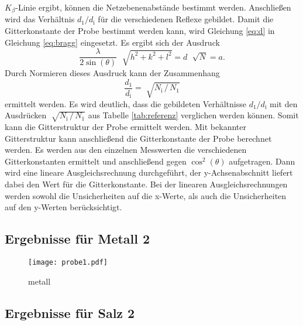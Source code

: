 $K_\beta$-Linie ergibt, können die Netzebenenabstände bestimmt werden. Anschließen wird das Verhältnis $d_1 / d_\text{i}$ für die verschiedenen Reflexe gebildet.\newline
Damit die Gitterkonstante der Probe bestimmt werden kann, wird Gleichung \eqref{eq:d} in Gleichung \eqref{eq:bragg} eingesetzt. Es ergibt sich der Ausdruck
\begin{equation}
  \frac{\lambda}{2\sin(\theta)}\,\,\sqrt[]{h^2+k^2+l^2}=d\,\,\sqrt[]{N}=a.
\end{equation}
Durch Normieren dieses Ausdruck kann der Zusammenhang
\begin{equation}
\frac{d_1}{d_\text{i}}=\sqrt[]{N_\text{i}\, / \, N_1}
\end{equation}
ermittelt werden. Es wird deutlich, dass die gebildeten Verhältnisse $d_1 / d_\text{i}$ mit den Ausdrücken $\sqrt[]{N_\text{i}\, / \, N_1}$ aus Tabelle
\ref{tab:referenz} verglichen werden können. Somit kann die Gitterstruktur der Probe ermittelt werden.
Mit bekannter Gitterstruktur kann anschließend die Gitterkonstante der Probe berechnet werden. Es werden aus den einzelnen Messwerten die verschiedenen
Gitterkonstanten ermittelt und anschließend gegen $\cos^2(\theta)$ aufgetragen. Dann wird eine lineare Ausgleichsrechnung durchgeführt, der y-Achsenabschnitt
liefert dabei den Wert für die Gitterkonstante. Bei der linearen Ausgleichsrechnungen werden sowohl die Unsicherheiten auf die x-Werte, als auch die Unsicherheiten auf
den y-Werten berücksichtigt.

\subsection{Ergebnisse für Metall 2}



\begin{figure}[H]
  \centering
  \texttt{[image: probe1.pdf]}
  \caption{metall}
  \label{abb:metall}
\end{figure}

\subsection{Ergebnisse für Salz 2}

